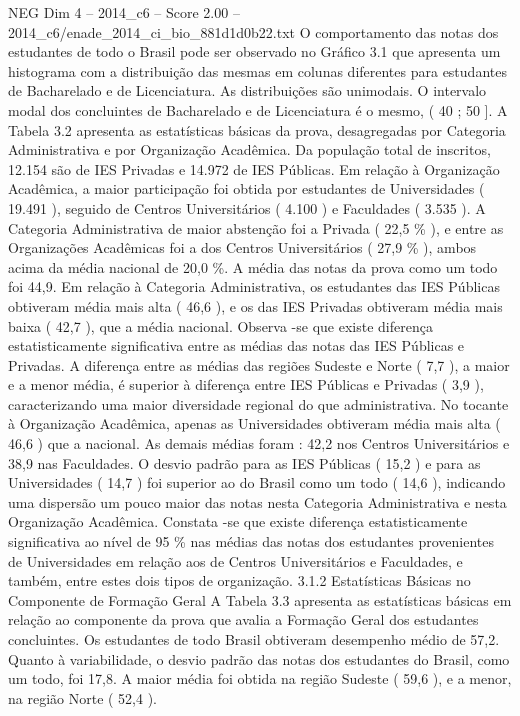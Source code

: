 \begin{textsample}{NEG Dim 4 – 2014\_c6 – Score 2.00 – 2014\_c6/enade\_2014\_ci\_bio\_881d1d0b22.txt}
O comportamento das notas dos estudantes de todo o Brasil pode ser observado no Gráfico 3.1 que apresenta um histograma com a distribuição das mesmas em colunas diferentes para estudantes de Bacharelado e de Licenciatura.
As distribuições são unimodais.
O intervalo modal dos concluintes de Bacharelado e de Licenciatura é o mesmo, ( 40 ; 50 ].
A Tabela 3.2 apresenta as estatísticas básicas da prova, desagregadas por Categoria Administrativa e por Organização Acadêmica.
Da população total de inscritos, 12.154 são de IES Privadas e 14.972 de IES Públicas.
Em relação à Organização Acadêmica, a maior participação foi obtida por estudantes de Universidades ( 19.491 ), seguido de Centros Universitários ( 4.100 ) e Faculdades ( 3.535 ).
A Categoria Administrativa de maior abstenção foi a Privada ( 22,5 \% ), e entre as Organizações Acadêmicas foi a dos Centros Universitários ( 27,9 \% ), ambos acima da média nacional de 20,0 \%.
A média das notas da prova como um todo foi 44,9.
Em relação à Categoria Administrativa, os estudantes das IES Públicas obtiveram média mais alta ( 46,6 ), e os das IES Privadas obtiveram média mais baixa ( 42,7 ), que a média nacional.
Observa -se que existe diferença estatisticamente significativa entre as médias das notas das IES Públicas e Privadas.
A diferença entre as médias das regiões Sudeste e Norte ( 7,7 ), a maior e a menor média, é superior à diferença entre IES Públicas e Privadas ( 3,9 ), caracterizando uma maior diversidade regional do que administrativa.
No tocante à Organização Acadêmica, apenas as Universidades obtiveram média mais alta ( 46,6 ) que a nacional.
As demais médias foram : 42,2 nos Centros Universitários e 38,9 nas Faculdades.
O desvio padrão para as IES Públicas ( 15,2 ) e para as Universidades ( 14,7 ) foi superior ao do Brasil como um todo ( 14,6 ), indicando uma dispersão um pouco maior das notas nesta Categoria Administrativa e nesta Organização Acadêmica.
Constata -se que existe diferença estatisticamente significativa ao nível de 95 \% nas médias das notas dos estudantes provenientes de Universidades em relação aos de Centros Universitários e Faculdades, e também, entre estes dois tipos de organização. 3.1.2 Estatísticas Básicas no Componente de Formação Geral A Tabela 3.3 apresenta as estatísticas básicas em relação ao componente da prova que avalia a Formação Geral dos estudantes concluintes.
Os estudantes de todo Brasil obtiveram desempenho médio de 57,2.
Quanto à variabilidade, o desvio padrão das notas dos estudantes do Brasil, como um todo, foi 17,8.
A maior média foi obtida na região Sudeste ( 59,6 ), e a menor, na região Norte ( 52,4 ).

\end{textsample}
